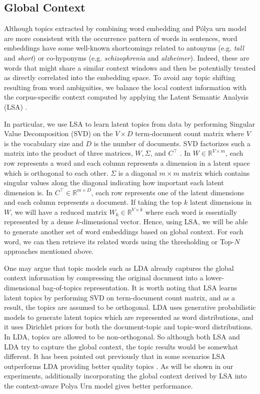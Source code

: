 \documentclass[letterpaper]{article}
\begin{document}
\subsection{Global Context}

Although topics extracted by combining word embedding and P\'{o}lya urn model are more consistent with the occurrence pattern of words in sentences, word embeddings have some well-known shortcomings related to antonyms (e.g. \textit{tall} and \textit{short}) or co-hyponyms (e.g. \textit{schizophrenia} and \textit{alzheimer}). Indeed, these are words that might share a similar context windows and then be potentially treated as directly correlated into the embedding space. To avoid any topic shifting resulting from word ambiguities, %
we balance the local context information with the corpus-specific context computed by applying the Latent Semantic Analysis (LSA) \cite{Deerwester90}.

In particular, we use LSA to learn latent topics from data by performing Singular Value Decomposition (SVD) on the $V\times D$ term-document count matrix where $V$ is the vocabulary size and $D$ is the number of documents. SVD factorizes such a matrix into the product of three matrices, $W, \Sigma$, and $C^\intercal$ . In $W\in\mathbb{R}^{V\times m}$, each row represents a word and each column represents a dimension in a latent space which is orthogonal to each other. $\Sigma$ is a diagonal $m\times m$ matrix which contains singular values along the diagonal indicating how important each latent dimension is. In $C^\intercal\in\mathbb{R}^{m\times D}$, each row represents one of the latent dimensions and each column represents a document. If taking the top $k$ latent dimensions in $W$, we will have a reduced matrix $W_k\in\mathbb{R}^{V\times k}$ where each word is essentially represented by a dense $k$-dimensional vector. Hence, using LSA, we will be able to generate another set of word embeddings based on global context. For each word, we can then retrieve its related words using the thresholding or Top-$N$ approaches mentioned above.

One may argue that topic models such as LDA already captures the global context information by compressing the original document into a lower-dimensional bag-of-topics representation. It is worth noting that LSA learns latent topics by performing SVD on term-document count matrix, and as a result, the topics are assumed to be orthogonal. LDA uses generative probabilistic models to generate latent topics which are represented as word distributions, and it uses Dirichlet priors for both the document-topic and topic-word distributions. In LDA, topics are allowed to be non-orthogonal. So although both LSA and LDA try to capture the global context, the topic results would be somewhat different. It has been pointed out previously that in some scenarios LSA outperforms LDA providing better quality topics \cite{Bergamaschi15}. As will be shown in our experiments, additionally incorporating the global context derived by LSA into the context-aware Polya Urn model gives better performance.
\end{document}
